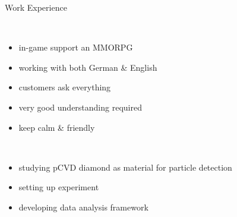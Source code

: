 \begin{frame}[t]{Work Experience}\centering\vspace*{5mm}
%
  \begin{minipage}[c][.8\textheight][t]{.45\textwidth}\centering
    \\[4ex]
    \vspace*{5ex}
    \begin{itemize}\itemspace{2ex}
      \item in-game support an MMORPG
      \item working with both German \& English
      \item customers ask everything
      \item very good understanding required
      \item keep calm \& friendly
    \end{itemize}
  \end{minipage}
%
  \begin{minipage}[c][.8\textheight][t]{.45\textwidth}\centering
    \\[2ex]
    \vspace*{4ex}
    \begin{itemize}\itemspace{2ex}
      \item studying \acs{pCVD} diamond as material for particle detection
      \item setting up experiment
      \item developing data analysis framework
    \end{itemize}
  \end{minipage}
%
\end{frame}
